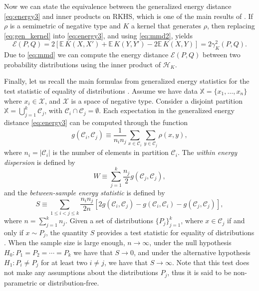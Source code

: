 \documentclass[aps,preprint,nofootinbib,floatfix]{revtex4-1}
\newcommand\Energy{\mathcal{E}}
\newcommand\E{\mathbb{E}}
\newcommand\kk{K}
\newcommand\Hk{{\mathcal{H}}_{\kk}}
\newcommand\C{{\mathcal{C}}}
\begin{document}
Now we can state the equivalence between the generalized 
energy distance \eqref{eq:energy3} and
inner products on RKHS, which is one of the main results of
\cite{Sejdinovic2013}. If $\rho$ is a semimetric
of negative type and $\kk$ a kernel that generates $\rho$, then
replacing \eqref{eq:gen_kernel} into
\eqref{eq:energy3}, and using \eqref{eq:mmd2}, yields
\begin{equation} \label{eq:Erho}
\Energy(P, Q) = 
2 \left[ \E \, \kk(X, X') + \E \, \kk(Y, Y') - 2\E \, \kk(X, Y)\right] 
= 2 \gamma_\kk^2(P,Q) .
\end{equation}
Due to \eqref{eq:mmd} we can compute the energy 
distance $\mathcal{E}(P, Q)$ between two probability distributions
using the inner 
product of $\Hk$. 

Finally, let us recall the main formulas from generalized energy statistics
for the test statistic of equality of distributions \cite{Szkely2013}. 
Assume we have data $\mathbb{X} = \{ x_1,\dotsc, x_n \}$ where
$x_i \in \mathcal{X}$, and $\mathcal{X}$ is a space of negative type.
Consider a disjoint partition $\mathbb{X} = \bigcup_{j=1}^k \C_j$, with
$\C_i \cap \C_j = \emptyset$.
Each expectation in the generalized energy distance
\eqref{eq:energy3}
can be computed 
through the function
\begin{equation}
\label{eq:g_def}
g (\C_i, \C_j) \equiv 
\dfrac{1}{n_i n_j}
\sum_{x \in \C_i} 
\sum_{y \in \C_j} \rho(x, y) ,
\end{equation}
where $n_i = |\C_i|$ is the number of elements in partition
$\C_i$. 
The \emph{within energy dispersion} is defined by
\begin{equation}
\label{eq:within}
W \equiv
\sum_{j=1}^{k} \dfrac{n_j}{2} g(\C_j, \C_j),
\end{equation}
and the \emph{between-sample energy statistic} is defined by
\begin{equation}
\label{eq:between}
S \equiv
\sum_{1 \le  i < j \le k } \dfrac{n_i n_{j}}{2 n} \left[
2 g(\C_i, \C_j) - 
g(\C_i, \C_i) - 
g(\C_j, \C_j)
\right],
\end{equation}
where $n = \sum_{j=1}^k n_j$.
Given a set of distributions
$\{ P_j\}_{j=1}^k$, where $x \in \C_j$ if and only if $x \sim P_j$, 
the quantity $S$ provides
a test statistic for equality of distributions
\cite{Szkely2013}.
When the sample size is large enough, $n\to \infty$,
under the null hypothesis $H_0: P_1=P_2=\dotsm=P_k$ we have that
$S\to 0$, 
and under
the alternative hypothesis $H_1: P_i \ne P_j$ for at least two $i\ne j$, 
we have that $S \to \infty$.
Note that this test does not make any assumptions
about the distributions $P_j$, thus it is said to be non-parametric or
distribution-free.
\end{document}
